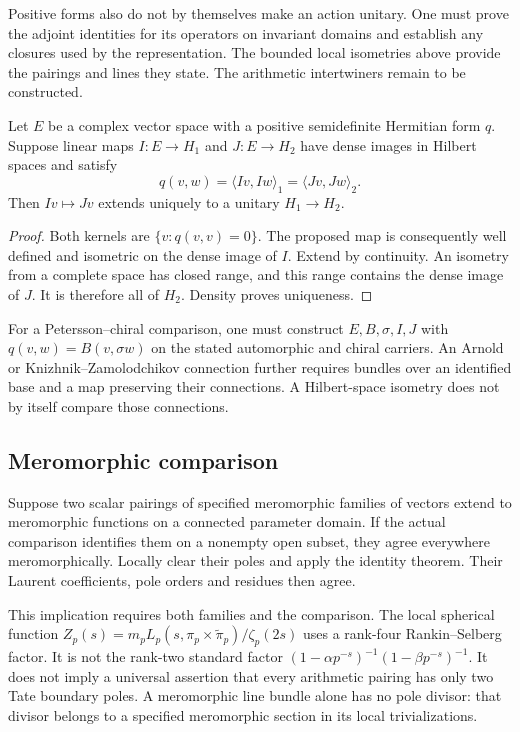Positive forms also do not by themselves make an action unitary. One must
prove the adjoint identities for its operators on invariant domains and
establish any closures used by the representation. The bounded local
isometries above provide the pairings and lines they state. The arithmetic
intertwiners remain to be constructed.

\begin{proposition}
\label{v4-arith:traces:dense-pairing}
Let $E$ be a complex vector space with a positive semidefinite Hermitian
form $q$. Suppose linear maps $I:E\to H_1$ and $J:E\to H_2$ have dense
images in Hilbert spaces and satisfy
\[
 q(v,w)=\langle Iv,Iw\rangle_1=\langle Jv,Jw\rangle_2.
\]
Then $Iv\mapsto Jv$ extends uniquely to a unitary $H_1\to H_2$.
\end{proposition}
\begin{proof}
Both kernels are $\{v:q(v,v)=0\}$. The proposed map is consequently well
defined and isometric on the dense image of $I$. Extend by continuity. An
isometry from a complete space has closed range, and this range contains the
dense image of $J$. It is therefore all of $H_2$. Density proves uniqueness.
\end{proof}

For a Petersson--chiral comparison, one must construct $E,B,\sigma,I,J$ with
$q(v,w)=B(v,\sigma w)$ on the stated automorphic and chiral carriers. An
Arnold or Knizhnik--Zamolodchikov connection further requires bundles over
an identified base and a map preserving their connections. A Hilbert-space
isometry does not by itself compare those connections.

\subsection{Meromorphic comparison}

Suppose two scalar pairings of specified meromorphic families of vectors
extend to meromorphic functions on a connected parameter domain. If the
actual comparison identifies them on a nonempty open subset, they agree
everywhere meromorphically. Locally clear their poles and apply the identity
theorem. Their Laurent coefficients, pole orders and residues then agree.

This implication requires both families and the comparison. The local
spherical function $Z_p(s)=m_pL_p(s,\pi_p\times\widetilde\pi_p)/\zeta_p(2s)$
uses a rank-four Rankin--Selberg factor. It is not the rank-two standard
factor $(1-\alpha p^{-s})^{-1}(1-\beta p^{-s})^{-1}$. It does not imply a
universal assertion that every arithmetic pairing has only two Tate boundary
poles. A meromorphic line bundle alone has no pole divisor: that divisor
belongs to a specified meromorphic section in its local trivializations.

